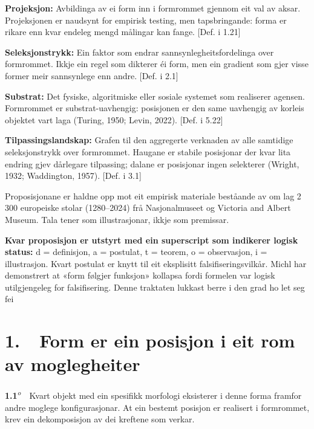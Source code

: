 \documentclass[10pt]{article}
\begin{document}
\textbf{Projeksjon:} Avbildinga av ei form inn i formrommet gjennom eit val av aksar. Projeksjonen er naudsynt for empirisk testing, men tapsbringande: forma er rikare enn kvar endeleg mengd målingar kan fange. [Def. i 1.21]




\textbf{Seleksjonstrykk:} Ein faktor som endrar sannsynlegheitsfordelinga over formrommet. Ikkje ein regel som dikterer éi form, men ein gradient som gjer visse former meir sannsynlege enn andre. [Def. i 2.1]




\textbf{Substrat:} Det fysiske, algoritmiske eller sosiale systemet som realiserer agensen. Formrommet er substrat-uavhengig: posisjonen er den same uavhengig av korleis objektet vart laga (Turing, 1950; Levin, 2022). [Def. i 5.22]




\textbf{Tilpassingslandskap:} Grafen til den aggregerte verknaden av alle samtidige seleksjonstrykk over formrommet. Haugane er stabile posisjonar der kvar lita endring gjev dårlegare tilpassing; dalane er posisjonar ingen selekterer (Wright, 1932; Waddington, 1957). [Def. i 3.1]


Proposisjonane er haldne opp mot eit empirisk materiale beståande av om lag 2 300 europeiske stolar (1280–2024) frå Nasjonalmuseet og Victoria and Albert Museum. Tala tener som illustrasjonar, ikkje som premissar.



\textbf{Kvar proposisjon er utstyrt med ein superscript som indikerer logisk status:} d = definisjon, a = postulat, t = teorem, o = observasjon, i = illustrasjon. Kvart postulat er knytt til eit eksplisitt falsifiseringsvilkår. Michl har demonstrert at «form følgjer funksjon» kollapsa fordi formelen var logisk utilgjengeleg for falsifisering. Denne traktaten lukkast berre i den grad ho let seg fei




\mainmatter





\chapter*{1.~~Form er ein posisjon i eit rom av moglegheiter}




\noindent\textbf{1.1}\textsuperscript{\textit{o}}~~Kvart objekt med ein spesifikk morfologi eksisterer i denne forma framfor andre moglege konfigurasjonar. At ein bestemt posisjon er realisert i formrommet, krev ein dekomposisjon av dei kreftene som verkar.
\end{document}
